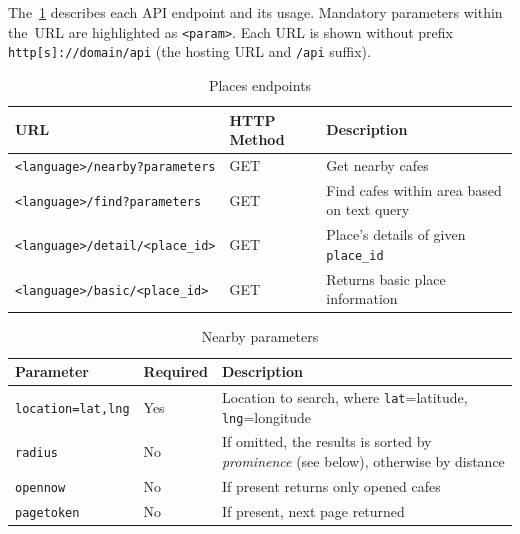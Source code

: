 The~\cref{table:cta-places} describes each API endpoint and its usage. Mandatory parameters within the~URL are highlighted as \verb|<param>|. Each URL is shown without prefix \verb|http[s]://domain/api| (the hosting URL and \verb|/api| suffix).
\begin{table}[ht]
\centering
\begin{tabularx}{\textwidth}{|l|l|X|}
\hline
\textbf{URL} & \textbf{HTTP Method} & \textbf{Description} \\ \hline
\verb|<language>/nearby?parameters| & GET & Get nearby cafes \\ \hline
\verb|<language>/find?parameters| & GET & Find cafes within area based on text query \\ \hline
\verb|<language>/detail/<place_id>| & GET & Place's details of given \verb|place_id| \\ \hline
\verb|<language>/basic/<place_id>| & GET & Returns basic place information \\ \hline
\end{tabularx}
\caption{Places endpoints}
\label{table:cta-places}
\end{table}
\begin{table}[ht]
\centering
\begin{tabularx}{\textwidth}{|l|l|X|}
\hline
\textbf{Parameter} & \textbf{Required} & \textbf{Description} \\ \hline
\verb|location=lat,lng| & Yes & Location to search, where \verb|lat|=latitude, \verb|lng|=longitude \\ \hline
\verb|radius| & No & If omitted, the results is sorted by \textit{prominence} (see below), otherwise by distance\\ \hline
\verb|opennow| & No & If present returns only opened cafes\\ \hline
\verb|pagetoken| & No & If present, next page returned\\ \hline
\end{tabularx}
\caption{Nearby parameters}
\label{table:cta-nearby-params}
\end{table}

